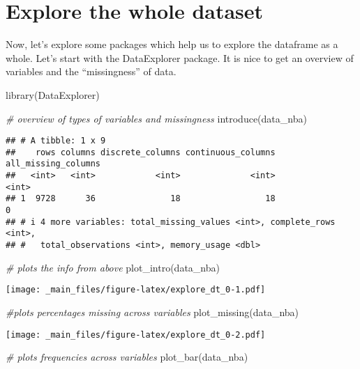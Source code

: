 \documentclass[
]{book}
\newenvironment{Shaded}{\begin{snugshade}}{\end{snugshade}}
\newcommand{\CommentTok}[1]{\textcolor[rgb]{0.56,0.35,0.01}{\textit{#1}}}
\newcommand{\FunctionTok}[1]{\textcolor[rgb]{0.00,0.00,0.00}{#1}}
\newcommand{\NormalTok}[1]{#1}
\begin{document}
\hypertarget{explore-the-whole-dataset}{%
\section{Explore the whole dataset}\label{explore-the-whole-dataset}}

Now, let's explore some packages which help us to explore the dataframe as a whole.
Let's start with the DataExplorer package. It is nice to get an overview of variables and the ``missingness'' of data.

\begin{Shaded}
\begin{Highlighting}[]
\FunctionTok{library}\NormalTok{(DataExplorer)}

\CommentTok{\# overview of types of variables and missingness}
\FunctionTok{introduce}\NormalTok{(data\_nba)}
\end{Highlighting}
\end{Shaded}

\begin{verbatim}
## # A tibble: 1 x 9
##    rows columns discrete_columns continuous_columns all_missing_columns
##   <int>   <int>            <int>              <int>               <int>
## 1  9728      36               18                 18                   0
## # i 4 more variables: total_missing_values <int>, complete_rows <int>,
## #   total_observations <int>, memory_usage <dbl>
\end{verbatim}

\begin{Shaded}
\begin{Highlighting}[]
\CommentTok{\# plots the info from above}
\FunctionTok{plot\_intro}\NormalTok{(data\_nba)}
\end{Highlighting}
\end{Shaded}

\texttt{[image: \_main\_files/figure-latex/explore\_dt\_0-1.pdf]}

\begin{Shaded}
\begin{Highlighting}[]
\CommentTok{\#plots percentages missing across variables}
\FunctionTok{plot\_missing}\NormalTok{(data\_nba)}
\end{Highlighting}
\end{Shaded}

\texttt{[image: \_main\_files/figure-latex/explore\_dt\_0-2.pdf]}

\begin{Shaded}
\begin{Highlighting}[]
\CommentTok{\# plots frequencies across variables}
\FunctionTok{plot\_bar}\NormalTok{(data\_nba)}
\end{Highlighting}
\end{Shaded}
\end{document}
